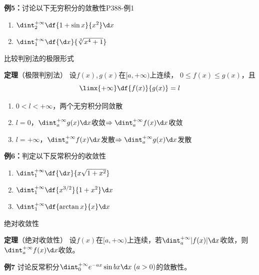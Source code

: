 \begin{frame}
	\linespread{2}
	\begin{exampleblock}{{\bf 例5：}讨论以下无穷积分的敛散性\hfill P388-例1}
		\begin{enumerate}\pause 
		  \item $\dint_2^{+\infty}\df{1+\sin x}{x^2}\d x$\pause 
		  \item $\dint_1^{+\infty}\df{\d x}{\sqrt[3]{x^4+1}}$
		\end{enumerate}
	\end{exampleblock}
\end{frame}

\begin{frame}{比较判别法的极限形式}
	\linespread{1.2}\pause 
	\begin{alertblock}{{\bf 定理}（极限判别法）\hfill}
		设$f(x),g(x)$在$[a,+\infty)$上连续，
		$0\leq f(x)\leq g(x)$，且
		$$\limx{+\infty}\df{f(x)}{g(x)}=l$$\pause 
		\vspace{-1em}
		\begin{enumerate}
		  \item $0<l<+\infty$，两个无穷积分同敛散\pause 
		  \item
		  $l=0$，$\dint_a^{+\infty}g(x)\d x$收敛$\Rightarrow\dint_a^{+\infty}f(x)\d x$收敛\pause 
		  \item
		  $l=+\infty$，$\dint_a^{+\infty}f(x)\d x$发散$\Rightarrow\dint_a^{+\infty}g(x)\d x$发散
		\end{enumerate}
	\end{alertblock}
\end{frame}

\begin{frame}
	\linespread{1.2}
	\begin{exampleblock}{{\bf 例6：}判定以下反常积分的收敛性\hfill}
		\begin{enumerate}\pause 
		  \item $\dint_1^{+\infty}\df{\d x}{x\sqrt{1+x^2}}$\pause 
		  \item $\dint_1^{+\infty}\df{x^{3/2}}{1+x^2}\d x$\pause 
		  \item $\dint_1^{+\infty}\df{\arctan x}{x}\d x$
		\end{enumerate}
	\end{exampleblock}
\end{frame}

\begin{frame}{绝对收敛性}
	\linespread{1.2}\pause 
	\begin{alertblock}{{\bf 定理}（绝对收敛性）\hfill}
		设$f(x)$在$[a,+\infty)$上连续，若$\dint_a^{+\infty}|f(x)|\d x$收敛，则
		$\dint_a^{+\infty}f(x)\d x$收敛。
	\end{alertblock}\pause 
	\begin{exampleblock}{{\bf 例7}\hfill}
		讨论反常积分$\dint_0^{+\infty}e^{-ax}\sin bx\d x\;(a>0)$的敛散性。
	\end{exampleblock}
\end{frame}

